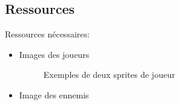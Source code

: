 \subsection{Ressources}

Ressources nécessaires:
\begin{itemize}
    \item Images des joueurs
    
\begin{figure}[H]
\begin{center}
%
\qquad
{}%
\caption{\label{slaythespiregame}Exemples de deux sprites de joueur}
\end{center}
\end{figure}

\item Image des ennemis


\end{itemize}
